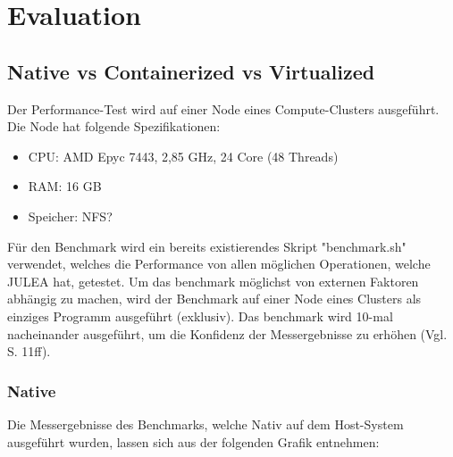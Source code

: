 \chapter{Evaluation}

\section{Native vs Containerized vs Virtualized}

Der Performance-Test wird auf einer Node eines Compute-Clusters ausgeführt. Die Node hat folgende Spezifikationen:

\begin{itemize}
    \item CPU: AMD Epyc 7443, 2,85 GHz, 24 Core (48 Threads)
    \item RAM: 16 GB
    \item Speicher: NFS?
\end{itemize}

Für den Benchmark wird ein bereits existierendes Skript "benchmark.sh" verwendet, welches die Performance von allen möglichen Operationen, welche JULEA hat, getestet. Um das benchmark möglichst von externen Faktoren abhängig zu machen, wird der Benchmark auf einer Node eines Clusters als einziges Programm ausgeführt (exklusiv). Das benchmark wird 10-mal nacheinander ausgeführt, um die Konfidenz der Messergebnisse zu erhöhen (Vgl. \cite{kaliberaRigorousBenchmarkingReasonable2013} S. 11ff). 

\subsection{Native}

Die Messergebnisse des Benchmarks, welche Nativ auf dem Host-System ausgeführt wurden, lassen sich aus der folgenden Grafik entnehmen:

